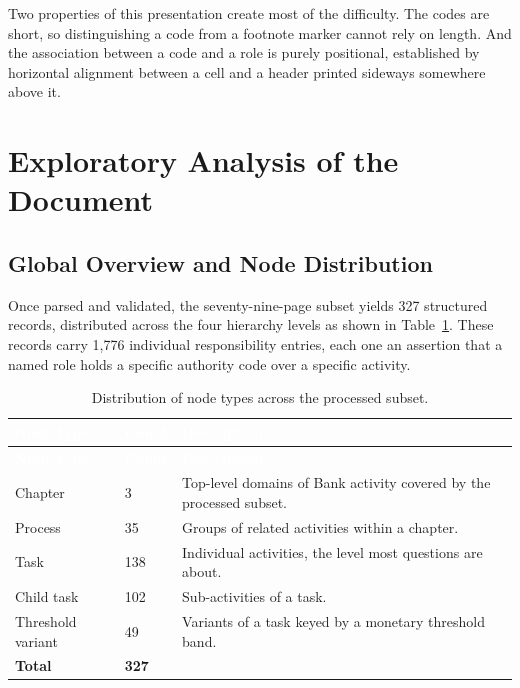 Two properties of this presentation create most of the difficulty. The codes are short, so distinguishing a code from a footnote marker cannot rely on length. And the association between a code and a role is purely positional, established by horizontal alignment between a cell and a header printed sideways somewhere above it.

\section{Exploratory Analysis of the Document}

\subsection{Global Overview and Node Distribution}

Once parsed and validated, the seventy-nine-page subset yields 327 structured records, distributed across the four hierarchy levels as shown in Table~\ref{tab:nodedist}. These records carry 1,776 individual responsibility entries, each one an assertion that a named role holds a specific authority code over a specific activity.

\begin{longtable}{|p{}|p{}|p{}|}
\caption{Distribution of node types across the processed subset.}\label{tab:nodedist}\\
\hline
\rowcolor{thesisgreen}\textcolor{white}{\textbf{Node type}} & \textcolor{white}{\textbf{Count}} & \textcolor{white}{\textbf{Description}} \\
\hline
\endfirsthead
\hline
\rowcolor{thesisgreen}\textcolor{white}{\textbf{Node type}} & \textcolor{white}{\textbf{Count}} & \textcolor{white}{\textbf{Description}} \\
\hline
\endhead
Chapter & 3 & Top-level domains of Bank activity covered by the processed subset. \\ \hline
Process & 35 & Groups of related activities within a chapter. \\ \hline
Task & 138 & Individual activities, the level most questions are about. \\ \hline
Child task & 102 & Sub-activities of a task. \\ \hline
Threshold variant & 49 & Variants of a task keyed by a monetary threshold band. \\ \hline
\textbf{Total} & \textbf{327} & \\ \hline
\end{longtable}

